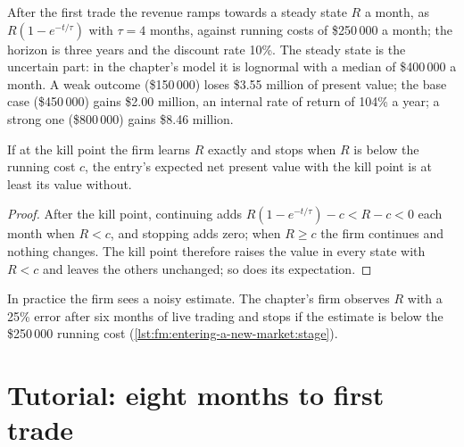 After the first trade the revenue ramps towards a steady state $R$ a month, as $R(1-e^{-t/\tau})$ with $\tau=4$ months, against running costs of
\$250\,000 a month; the horizon is three years and the discount rate 10\%. The steady state is the uncertain part: in the chapter's model it is
lognormal with a median of \$400\,000 a month. A weak outcome (\$150\,000) loses \$3.55 million of present value; the base case (\$450\,000) gains
\$2.00 million, an internal rate of return of 104\% a year; a strong one (\$800\,000) gains \$8.46 million.

\begin{proposition}\label{prop:fm:entering-a-new-market:kill}
If at the kill point the firm learns $R$ exactly and stops when $R$ is below the running cost $c$, the entry's expected net present value with the
kill point is at least its value without.
\end{proposition}

\begin{proof}
After the kill point, continuing adds $R(1-e^{-t/\tau})-c<R-c<0$ each month when $R<c$, and stopping adds zero; when $R\ge c$ the firm continues and
nothing changes. The kill point therefore raises the value in every state with $R<c$ and leaves the others unchanged; so does its expectation.
\end{proof}

In practice the firm sees a noisy estimate. The chapter's firm observes $R$ with a 25\% error after six months of live trading and stops if the
estimate is below the \$250\,000 running cost (\cref{lst:fm:entering-a-new-market:stage}).

\label{lst:fm:entering-a-new-market:stage}

\section{Tutorial: eight months to first trade}\label{tut:fm:entering-a-new-market:tut}


